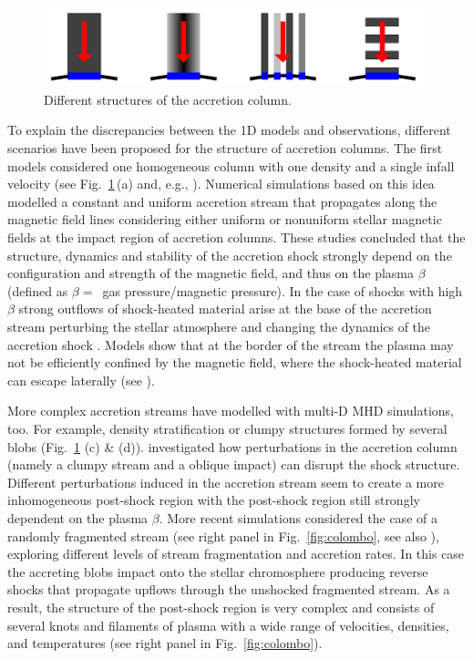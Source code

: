 \begin{figure}
    \centering
    \includegraphics[width=11cm]{figs/column_sketch.pdf}
    \caption{Different structures of the accretion column.}
    \label{fig:column}
\end{figure}


To explain the discrepancies between the 1D models and observations, different scenarios have been proposed for the structure of accretion columns. The first models considered one homogeneous column with one density and a single infall velocity (see Fig.~\ref{fig:column}\,(a) and, e.g., \cite{Orlando_2010,Orlando_2013}). Numerical simulations based on this idea modelled a constant and uniform accretion stream that propagates along the magnetic field lines considering either uniform \cite{Orlando_2010} or nonuniform \citep{Orlando_2013} stellar magnetic fields at the impact region of accretion columns.
These studies concluded that the structure, dynamics and stability of the accretion shock strongly depend on the configuration and strength of the magnetic field, and thus on the plasma $\beta$ (defined as $\beta =$~gas pressure/magnetic pressure). In the case of shocks with high $\beta$ strong outflows of shock-heated material arise at the base of the accretion stream perturbing the stellar atmosphere and changing the dynamics of the accretion shock \cite{Orlando_2010}. Models show that at the border of the stream the plasma may not be efficiently confined by the magnetic field, where the shock-heated material can escape laterally (see \cite{Orlando_2010,Orlando_2013}).

More complex accretion streams have modelled with multi-D MHD simulations, too. For example, density stratification or clumpy structures formed by several blobs (Fig.~\ref{fig:column} (c) \& (d)). \cite{Matsakos_2013} investigated how perturbations in the accretion column (namely a clumpy stream and a oblique impact) can disrupt the shock structure. Different perturbations induced in the accretion stream seem to create a more inhomogeneous post-shock region with the post-shock region still strongly dependent on the plasma $\beta$.
More recent simulations considered the case of a randomly fragmented stream (see right panel in Fig.~\ref{fig:colombo}, see also \cite{Colombo_2016}), exploring different levels of stream fragmentation and accretion rates. In this case the accreting blobs impact onto the stellar chromosphere producing reverse shocks that propagate upflows through the unshocked fragmented stream. As a result, the structure of the post-shock region is very complex and consists of several knots and filaments of plasma with a wide range of velocities, densities, and temperatures (see right panel in Fig.~\ref{fig:colombo}).


